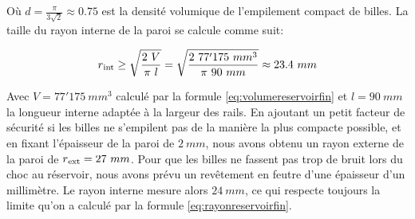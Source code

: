 Où \(d = \frac{ \pi }{3\sqrt{2}} \approx 0.75\) est la densité volumique de l'empilement compact de billes.
La taille du rayon interne de la paroi se calcule comme suit:

\begin{equation}r\textsubscript{int}\geq\sqrt{\frac{2\ V}{\pi\ l}}=\sqrt{\frac{2\ 77'175\ mm^3}{\pi\ 90\ mm}} \approx 23.4\ mm \label{eq:rayonreservoirfin}\end{equation}

Avec \(V=77'175\ mm^3\) calculé par la formule \ref{eq:volumereservoirfin} et \(l=90\ mm\) la longueur interne adaptée à la largeur des rails. En ajoutant un petit facteur de sécurité si les billes ne s'empilent pas de la manière la plus compacte possible, et en fixant l'épaisseur de la paroi de \(2\ mm \), nous avons obtenu un rayon externe de la paroi de \(r\textsubscript{ext}=27\ mm\). Pour que les billes ne fassent pas trop de bruit lors du choc au réservoir, nous avons prévu un revêtement en feutre d'une épaisseur d'un millimètre. Le rayon interne mesure alors \(24\ mm \), ce qui respecte toujours la limite qu'on a calculé par la formule \ref{eq:rayonreservoirfin}.
